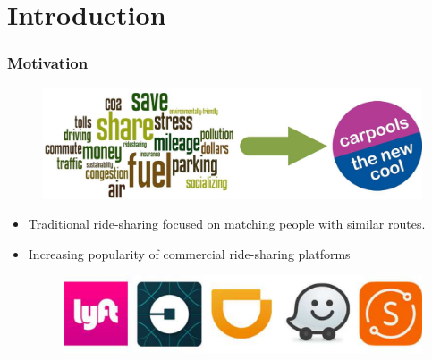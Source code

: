 \documentclass[t]{beamer}
\begin{document}
\section*{Introduction}
\begin{frame}\frametitle{Motivation}
\begin{figure}
	\centering
    \includegraphics[width = 0.75\columnwidth]{carpool}
\end{figure}
\begin{itemize}
\item<2-> Traditional ride-sharing focused on matching people with similar routes.
\item<3-> Increasing popularity of commercial ride-sharing platforms
\begin{figure}
	\centering
    \includegraphics[width = 0.55\columnwidth]{ride-sharings}
\end{figure}
\end{itemize}
\end{frame}
\end{document}
